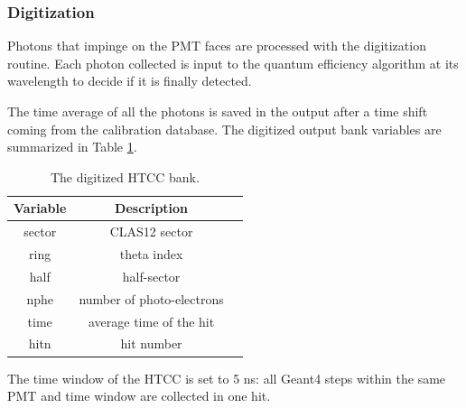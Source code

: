 \subsubsection{Digitization}
Photons that impinge on the PMT faces are processed with the digitization routine.
Each photon collected is input to the quantum efficiency algorithm at its wavelength to decide if it is finally detected.

The time average of all the photons is saved in the output after a time shift coming from the calibration database.
The digitized output bank variables are summarized in Table \ref{tab:htccBank}.

\begin{table}[h]
	\begin{center}
		\begin{tabular}{| c | c | c |}
			\hline \hline
			Variable  & Description                         \\
			\hline
             sector   &                   CLAS12 sector     \\
             ring     &                     theta index     \\
             half     &                     half-sector     \\
             nphe     &        number of photo-electrons     \\
             time     &         average time of the hit     \\
             hitn     &                      hit number     \\
			\hline \hline
		\end{tabular}
	\end{center}
	\caption{The digitized HTCC bank.}\label{tab:htccBank}
\end{table}

The time window  of the HTCC is set to 5 ns: all Geant4 steps within the same PMT and time window are collected in one hit.
